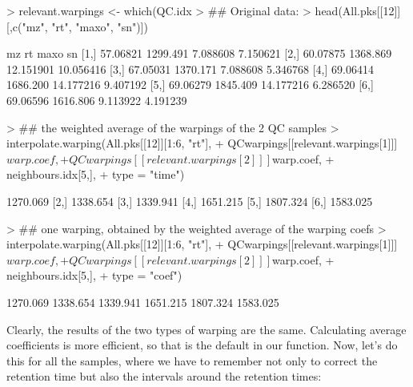 \documentclass[a4paper,11pt]{article}
\begin{document}
\begin{Schunk}
\begin{Sinput}
> relevant.warpings <- which(QC.idx %
> ## Original data:
> head(All.pks[[12]][,c("mz", "rt", "maxo", "sn")])
\end{Sinput}
\begin{Soutput}
           mz       rt      maxo        sn
[1,] 57.06821 1299.491  7.088608  7.150621
[2,] 60.07875 1368.869 12.151901 10.056416
[3,] 67.05031 1370.171  7.088608  5.346768
[4,] 69.06414 1686.200 14.177216  9.407192
[5,] 69.06279 1845.409 14.177216  6.286520
[6,] 69.06596 1616.806  9.113922  4.191239
\end{Soutput}
\begin{Sinput}
> ## the weighted average of the warpings of the 2 QC samples
> interpolate.warping(All.pks[[12]][1:6, "rt"],
+                     QCwarpings[[relevant.warpings[1]]]$warp.coef,
+                     QCwarpings[[relevant.warpings[2]]]$warp.coef,
+                     neighbours.idx[5,],
+                     type = "time")
\end{Sinput}
\begin{Soutput}
         [,1]
[1,] 1270.069
[2,] 1338.654
[3,] 1339.941
[4,] 1651.215
[5,] 1807.324
[6,] 1583.025
\end{Soutput}
\begin{Sinput}
> ## one warping, obtained by the weighted average of the warping coefs
> interpolate.warping(All.pks[[12]][1:6, "rt"],
+                     QCwarpings[[relevant.warpings[1]]]$warp.coef,
+                     QCwarpings[[relevant.warpings[2]]]$warp.coef,
+                     neighbours.idx[5,],
+                     type = "coef")               
\end{Sinput}
\begin{Soutput}
[1] 1270.069 1338.654 1339.941 1651.215 1807.324 1583.025
\end{Soutput}
\end{Schunk}
Clearly, the results of the two types of warping are the
same. Calculating average coefficients is more efficient, so that is
the default in our function. Now, let's do this for all the samples,
where we have to remember not only to correct the retention time but
also the intervals around the retention times:
\end{document}
